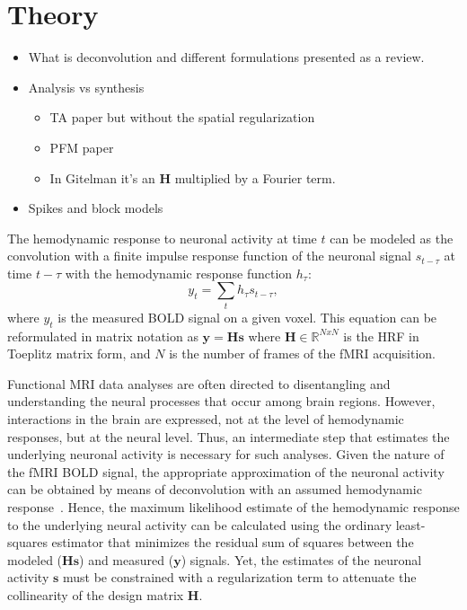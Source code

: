 \section{Theory}

\begin{itemize}
    \item What is deconvolution and different formulations presented as a review.
    \item Analysis vs synthesis
    \begin{itemize}
        \item TA paper but without the spatial regularization
        \item PFM paper
        \item In Gitelman it's an \(\mathbf{H}\) multiplied by a Fourier term.
    \end{itemize}
    \item Spikes and block models
\end{itemize}

The hemodynamic response to neuronal activity at time \(t\) can be modeled as the convolution with a finite impulse response function of the neuronal signal \(s_{t-\tau}\) at time \(t-\tau\) with the hemodynamic response function \(h_{\tau}\):
\begin{equation}
    \label{eq:gitelman}
    y_t = \sum_t h_{\tau} s_{t-\tau},
\end{equation}
where \(y_t\) is the measured BOLD signal on a given voxel. This equation can be reformulated in matrix notation as \(\mathbf{y} = \mathbf{Hs}\) where \(\mathbf{H} \in \mathbb{R}^{NxN}\) is the HRF in Toeplitz matrix form, and \(N\) is the number of frames of the fMRI acquisition.

Functional MRI data analyses are often directed to disentangling and understanding the neural processes that occur among brain regions. However, interactions in the brain are expressed, not at the level of hemodynamic responses, but at the neural level. Thus, an intermediate step that estimates the underlying neuronal activity is necessary for such analyses. Given the nature of the fMRI BOLD signal, the appropriate approximation of the neuronal activity can be obtained by means of deconvolution with an assumed hemodynamic response~\cite{gitelman2003modeling}. Hence, the maximum likelihood estimate of the hemodynamic response to the underlying neural activity can be calculated using the ordinary least-squares estimator that minimizes the residual sum of squares between the modeled (\(\mathbf{Hs}\)) and measured (\(\mathbf{y}\)) signals. Yet, the estimates of the neuronal activity \(\mathbf{s}\) must be constrained with a regularization term to attenuate the collinearity of the design matrix \(\mathbf{H}\).

